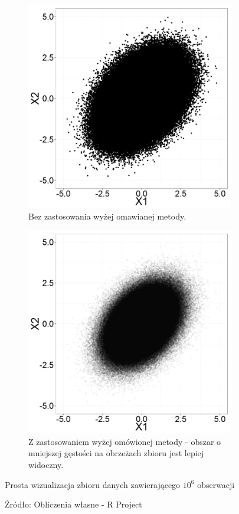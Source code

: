 \documentclass[man,mfu]{mgrwms}
\begin{document}
\begin{figure}[H]
\centering
 \begin{subfigure}[t]{0.35\textwidth}
  \includegraphics[width=\linewidth]{big1.png}
  \caption{Bez zastosowania wyżej omawianej metody.}
\end{subfigure}
 \begin{subfigure}[t]{0.35\textwidth}
  \includegraphics[width=\linewidth]{big2.png}
 \caption{Z zastosowaniem wyżej omówionej metody - obszar o mniejszej gęstości na obrzeżach zbioru jest lepiej widoczny.}
\end{subfigure}
\caption{Prosta wizualizacja zbioru danych zawierającego $10^6$ obserwacji}
\caption*{Źródło: Obliczenia własne - R Project}
\label{bigvis1}
\end{figure}
\end{document}
